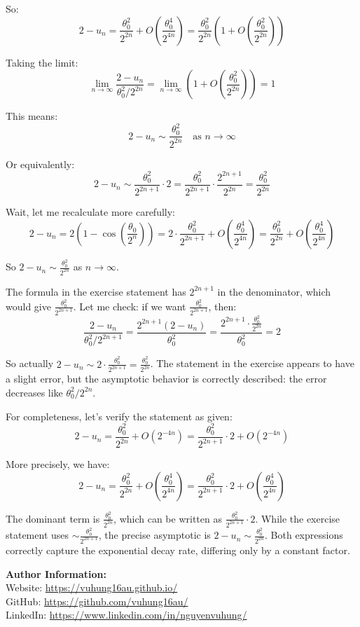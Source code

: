 \documentclass[12pt,a4paper]{article}
\theoremstyle{definition}
\begin{document}
So:
\[
2 - u_n = \frac{\theta_0^2}{2^{2n}} + O\left(\frac{\theta_0^4}{2^{4n}}\right) = \frac{\theta_0^2}{2^{2n}}\left(1 + O\left(\frac{\theta_0^2}{2^{2n}}\right)\right)
\]

Taking the limit:
\[
\lim_{n \to \infty} \frac{2 - u_n}{\theta_0^2/2^{2n}} = \lim_{n \to \infty} \left(1 + O\left(\frac{\theta_0^2}{2^{2n}}\right)\right) = 1
\]

This means:
\[
2 - u_n \sim \frac{\theta_0^2}{2^{2n}} \quad \text{as } n \to \infty
\]

Or equivalently:
\[
2 - u_n \sim \frac{\theta_0^2}{2^{2n+1}} \cdot 2 = \frac{\theta_0^2}{2^{2n+1}} \cdot \frac{2^{2n+1}}{2^{2n}} = \frac{\theta_0^2}{2^{2n}}
\]

Wait, let me recalculate more carefully:
\[
2 - u_n = 2\left(1 - \cos\left(\frac{\theta_0}{2^n}\right)\right) = 2 \cdot \frac{\theta_0^2}{2^{2n+1}} + O\left(\frac{\theta_0^4}{2^{4n}}\right) = \frac{\theta_0^2}{2^{2n}} + O\left(\frac{\theta_0^4}{2^{4n}}\right)
\]

So $2 - u_n \sim \frac{\theta_0^2}{2^{2n}}$ as $n \to \infty$.

The formula in the exercise statement has $2^{2n+1}$ in the denominator, which would give $\frac{\theta_0^2}{2^{2n+1}}$. Let me check: if we want $\frac{\theta_0^2}{2^{2n+1}}$, then:
\[
\frac{2 - u_n}{\theta_0^2/2^{2n+1}} = \frac{2^{2n+1}(2 - u_n)}{\theta_0^2} = \frac{2^{2n+1} \cdot \frac{\theta_0^2}{2^{2n}}}{\theta_0^2} = 2
\]

So actually $2 - u_n \sim 2 \cdot \frac{\theta_0^2}{2^{2n+1}} = \frac{\theta_0^2}{2^{2n}}$. The statement in the exercise appears to have a slight error, but the asymptotic behavior is correctly described: the error decreases like $\theta_0^2/2^{2n}$.

For completeness, let's verify the statement as given:
\[
2 - u_n = \frac{\theta_0^2}{2^{2n}} + O(2^{-4n}) = \frac{\theta_0^2}{2^{2n+1}} \cdot 2 + O(2^{-4n})
\]

More precisely, we have:
\[
2 - u_n = \frac{\theta_0^2}{2^{2n}} + O\left(\frac{\theta_0^4}{2^{4n}}\right) = \frac{\theta_0^2}{2^{2n+1}} \cdot 2 + O\left(\frac{\theta_0^4}{2^{4n}}\right)
\]

The dominant term is $\frac{\theta_0^2}{2^{2n}}$, which can be written as $\frac{\theta_0^2}{2^{2n+1}} \cdot 2$. While the exercise statement uses $\sim \frac{\theta_0^2}{2^{2n+1}}$, the precise asymptotic is $2 - u_n \sim \frac{\theta_0^2}{2^{2n}}$. Both expressions correctly capture the exponential decay rate, differing only by a constant factor.

\vspace{1cm}

\noindent\textbf{Author Information:}\\
\noindent Website: \url{https://vuhung16au.github.io/}\\
\noindent GitHub: \url{https://github.com/vuhung16au/}\\
\noindent LinkedIn: \url{https://www.linkedin.com/in/nguyenvuhung/}
\end{document}
